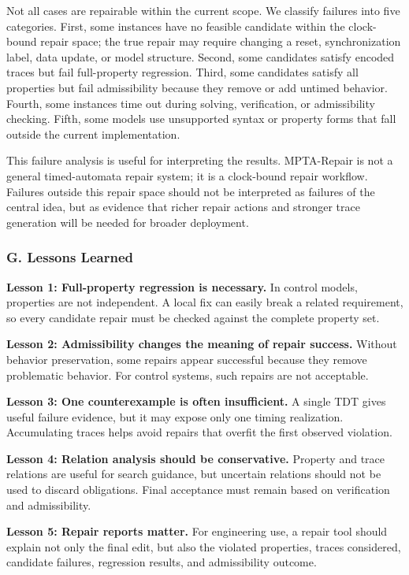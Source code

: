 \documentclass[
]{article}
\begin{document}
Not all cases are repairable within the current scope. We classify
failures into five categories. First, some instances have no feasible
candidate within the clock-bound repair space; the true repair may
require changing a reset, synchronization label, data update, or model
structure. Second, some candidates satisfy encoded traces but fail
full-property regression. Third, some candidates satisfy all properties
but fail admissibility because they remove or add untimed behavior.
Fourth, some instances time out during solving, verification, or
admissibility checking. Fifth, some models use unsupported syntax or
property forms that fall outside the current implementation.

This failure analysis is useful for interpreting the results.
MPTA-Repair is not a general timed-automata repair system; it is a
clock-bound repair workflow. Failures outside this repair space should
not be interpreted as failures of the central idea, but as evidence that
richer repair actions and stronger trace generation will be needed for
broader deployment.

\subsubsection{G. Lessons Learned}\label{g.-lessons-learned}

\textbf{Lesson 1: Full-property regression is necessary.} In control
models, properties are not independent. A local fix can easily break a
related requirement, so every candidate repair must be checked against
the complete property set.

\textbf{Lesson 2: Admissibility changes the meaning of repair success.}
Without behavior preservation, some repairs appear successful because
they remove problematic behavior. For control systems, such repairs are
not acceptable.

\textbf{Lesson 3: One counterexample is often insufficient.} A single
TDT gives useful failure evidence, but it may expose only one timing
realization. Accumulating traces helps avoid repairs that overfit the
first observed violation.

\textbf{Lesson 4: Relation analysis should be conservative.} Property
and trace relations are useful for search guidance, but uncertain
relations should not be used to discard obligations. Final acceptance
must remain based on verification and admissibility.

\textbf{Lesson 5: Repair reports matter.} For engineering use, a repair
tool should explain not only the final edit, but also the violated
properties, traces considered, candidate failures, regression results,
and admissibility outcome.
\end{document}
